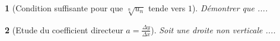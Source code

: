 \documentclass[10pt,a4paper]{book}
\theoremstyle{Exo}
\newtheorem{Exo}{}[chapter]
\begin{document}
	\begin{Exo}[{Condition suffisante pour que $\sqrt[n]{u_{n}}$ tende vers $1$}]
		Démontrer que ....
	\end{Exo}

	\begin{Exo}[{Etude du coefficient directeur $a = \frac{\Delta y}{\Delta x}$}]
		Soit une droite non verticale ....
	\end{Exo}
\end{document}
